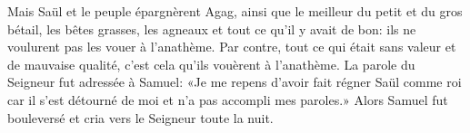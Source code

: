 Mais Saül et le peuple épargnèrent Agag,
	ainsi que le meilleur du petit et du gros bétail,
	les bêtes grasses, les agneaux et tout ce qu’il y avait de bon:
	ils ne voulurent pas les vouer à l’anathème.
Par contre, tout ce qui était sans valeur et de mauvaise qualité,
	c’est cela qu’ils vouèrent à l’anathème.
La parole du Seigneur fut adressée à Samuel:
	«Je me repens d’avoir fait régner Saül comme roi
	car il s’est détourné de moi et n’a pas accompli mes paroles.»
Alors Samuel fut bouleversé et cria vers le Seigneur toute la nuit.
